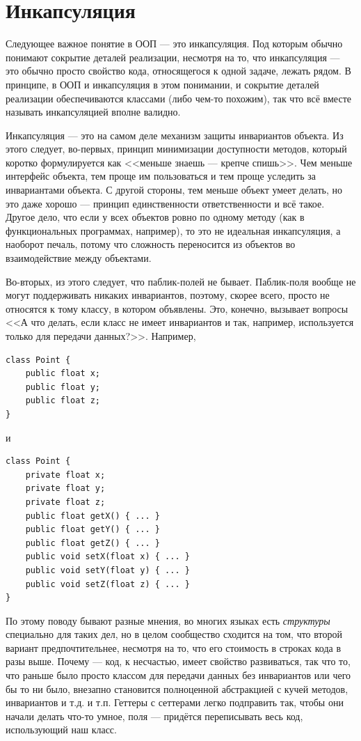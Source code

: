\documentclass{../../text-style}
\begin{document}
\section{Инкапсуляция}

Следующее важное понятие в ООП --- это инкапсуляция. Под которым обычно понимают сокрытие деталей реализации, несмотря на то, что инкапсуляция --- это обычно просто свойство кода, относящегося к одной задаче, лежать рядом. В принципе, в ООП и инкапсуляция в этом понимании, и сокрытие деталей реализации обеспечиваются классами (либо чем-то похожим), так что всё вместе называть инкапсуляцией вполне валидно.

Инкапсуляция --- это на самом деле механизм защиты инвариантов объекта. Из этого следует, во-первых, принцип минимизации доступности методов, который коротко формулируется как <<меньше знаешь --- крепче спишь>>. Чем меньше интерфейс объекта, тем проще им пользоваться и тем проще уследить за инвариантами объекта. С другой стороны, тем меньше объект умеет делать, но это даже хорошо --- принцип единственности ответственности и всё такое. Другое дело, что если у всех объектов ровно по одному методу (как в функциональных программах, например), то это не идеальная инкапсуляция, а наоборот печаль, потому что сложность переносится из объектов во взаимодействие между объектами.

Во-вторых, из этого следует, что паблик-полей не бывает. Паблик-поля вообще не могут поддерживать никаких инвариантов, поэтому, скорее всего, просто не относятся к тому классу, в котором объявлены. Это, конечно, вызывает вопросы <<А что делать, если класс не имеет инвариантов и так, например, используется только для передачи данных?>>. Например,

\begin{verbatim}
class Point {
    public float x;
    public float y;
    public float z;
}
\end{verbatim}

и

\begin{verbatim}
class Point {
    private float x;
    private float y;
    private float z;
    public float getX() { ... }
    public float getY() { ... }
    public float getZ() { ... }
    public void setX(float x) { ... }
    public void setY(float y) { ... }
    public void setZ(float z) { ... }
}
\end{verbatim}

По этому поводу бывают разные мнения, во многих языках есть \emph{структуры} специально для таких дел, но в целом сообщество сходится на том, что второй вариант предпочтительнее, несмотря на то, что его стоимость в строках кода в разы выше. Почему --- код, к несчастью, имеет свойство развиваться, так что то, что раньше было просто классом для передачи данных без инвариантов или чего бы то ни было, внезапно становится полноценной абстракцией с кучей методов, инвариантов и т.д. и т.п. Геттеры с сеттерами легко подправить так, чтобы они начали делать что-то умное, поля --- придётся переписывать весь код, использующий наш класс.
\end{document}
